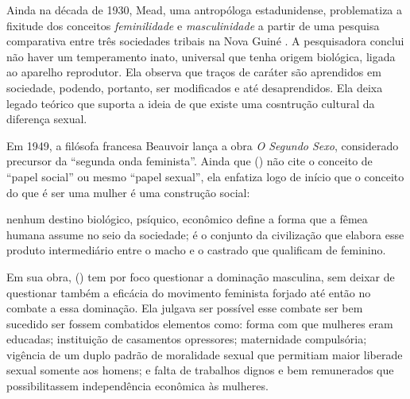 Ainda na década de 1930, Mead, uma antropóloga estadunidense, problematiza a fixitude dos conceitos \emph{feminilidade} e \emph{masculinidade} a partir de uma pesquisa comparativa entre três sociedades tribais na Nova Guiné  \cite{MEAD2000}. A pesquisadora conclui não haver um temperamento inato, universal que tenha origem biológica, ligada ao aparelho reprodutor. Ela observa que traços de caráter são aprendidos em sociedade, podendo, portanto, ser modificados e até desaprendidos. Ela deixa legado teórico que suporta a ideia de que existe uma cosntrução cultural da diferença sexual.

Em 1949, a filósofa francesa Beauvoir lança a obra \emph{O Segundo Sexo}, considerado precursor da ``segunda onda feminista''\cite{PISCITELLI2009}. Ainda que  (\citeyear{BEAUVOIR1967}) não cite o conceito de  ``papel social'' ou mesmo ``papel sexual'', ela enfatiza logo de início que o conceito do que é ser uma mulher é uma construção social:

\begin{citacao}
nenhum destino biológico, psíquico, econômico define a forma que a fêmea humana assume no seio da sociedade; é o conjunto da civilização que elabora esse produto intermediário entre o macho e o castrado que qualificam de feminino.
\cite[p.09]{BEAUVOIR1967}
\end{citacao}

Em sua obra,  (\citeyear{BEAUVOIR1967}) tem por foco questionar a dominação masculina, sem deixar de questionar também a eficácia do movimento feminista forjado até então no combate a essa dominação. Ela julgava ser possível esse combate ser bem sucedido ser fossem combatidos elementos como: forma com que mulheres eram educadas; instituição de casamentos opressores; maternidade compulsória; vigência de um duplo padrão de moralidade sexual que permitiam maior liberade sexual somente aos homens; e falta de trabalhos dignos e bem remunerados que possibilitassem independência econômica às mulheres. 

